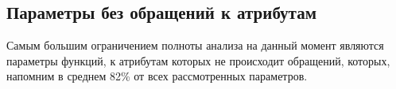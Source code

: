 








\subsection{Параметры без обращений к атрибутам}
\label{sub:attributeless-parameters}

Самым большим ограничением полноты анализа на данный момент являются параметры
функций, к атрибутам которых не происходит обращений, которых, напомним в
среднем 82\% от всех рассмотренных параметров.

